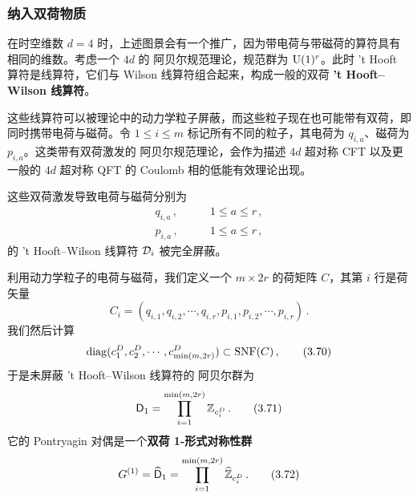 
\subsubsection{纳入双荷物质}

在时空维数 $d=4$ 时，上述图景会有一个推广，因为带电荷与带磁荷的算符具有相同的维数。考虑一个 $4d$ 的 阿贝尔规范理论，规范群为 $\mathrm{U}(1)^r$。此时 't Hooft 算符是线算符，它们与 Wilson 线算符组合起来，构成一般的双荷 \textbf{'t Hooft--Wilson 线算符}。

这些线算符可以被理论中的动力学粒子屏蔽，而这些粒子现在也可能带有双荷，即同时携带电荷与磁荷。令 $1\le i\le m$ 标记所有不同的粒子，其电荷为 $q_{i,a}$、磁荷为 $p_{i,a}$。这类带有双荷激发的 阿贝尔规范理论，会作为描述 $4d$ 超对称 CFT 以及更一般的 $4d$ 超对称 QFT 的 Coulomb 相的低能有效理论出现。

这些双荷激发导致电荷与磁荷分别为
\begin{align}
  q_{i,a}\,,&\qquad 1\le a\le r\,,\nonumber\\
  p_{i,a}\,,&\qquad 1\le a\le r\,, \tag{3.68}
\end{align}
的 't Hooft--Wilson 线算符 $\mathcal{D}_i$ 被完全屏蔽。

利用动力学粒子的电荷与磁荷，我们定义一个 $m\times 2r$ 的荷矩阵 $C$，其第 $i$ 行是荷矢量
\begin{equation}
  C_i=(q_{i,1},q_{i,2},\cdots,q_{i,r},p_{i,1},p_{i,2},\cdots,p_{i,r})\,. \tag{3.69}
\end{equation}
我们然后计算
\begin{equation}
  \operatorname{diag}(c_1^D,c_2^D,\cdots,c_{\min(m,2r)}^D)\subset \mathrm{SNF}(C)\,, \tag{3.70}
\end{equation}
于是未屏蔽 't Hooft--Wilson 线算符的 阿贝尔群为
\begin{equation}
  \mathsf{D}_1=\prod_{i=1}^{\min(m,2r)}\mathbb{Z}_{c_i^D}\,. \tag{3.71}
\end{equation}
它的 Pontryagin 对偶是一个\textbf{双荷 1-形式对称性群}
\begin{equation}
  G^{(1)}=\widehat{\mathsf{D}}_1=\prod_{i=1}^{\min(m,2r)}\widehat{\mathbb{Z}}_{c_i^D}\,. \tag{3.72}
\end{equation}

